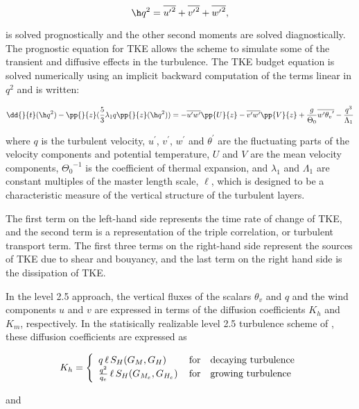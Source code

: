 \[ {\h}{q^2}={\overline{{u^{\prime}}^2}}+{\overline{{v^{\prime}}^2}}+{\overline{{w^{\prime}}^2}}, \]

is solved prognostically and the other second moments are solved diagnostically.
The prognostic equation for TKE allows the scheme to simulate 
some of the transient and diffusive effects in the turbulence. The TKE budget equation
is solved numerically using an implicit backward computation of the terms linear in $q^2$
and is written:

\[
{\dd{}{t} ({{\h} q^2})} - { \pp{}{z} ({ {5 \over 3} {{\lambda}_1} q { \pp {}{z} 
({\h}q^2)} })} =
{- \overline{{u^{\prime}}{w^{\prime}}} { \pp{U}{z} }} - {\overline{{v^{\prime}}{w^{\prime}}} 
{ \pp{V}{z} }} + {{g \over {\Theta_0}}{\overline{{w^{\prime}}{{{\theta}_v}^{\prime}}}} } 
- { q^3 \over {{\Lambda} _1} }
\]

where $q$ is the turbulent velocity, ${u^{\prime}}$, ${v^{\prime}}$, ${w^{\prime}}$ and 
${{\theta}^{\prime}}$ are the fluctuating parts of the velocity components and potential 
temperature, $U$ and $V$ are the mean velocity components, ${\Theta_0}^{-1}$ is the
coefficient of thermal expansion, and ${{\lambda}_1}$ and ${{\Lambda} _1}$ are constant
multiples of the master length scale, $\ell$, which is designed to be a characteristic measure
of the vertical structure of the turbulent layers.

The first term on the left-hand side represents the time rate of change of TKE, and
the second term is a representation of the triple correlation, or turbulent
transport term. The first three terms on the right-hand side represent the sources of
TKE due to shear and bouyancy, and the last term on the right hand side is the dissipation
of TKE.

In the level 2.5 approach, the vertical fluxes of the scalars $\theta_v$ and $q$ and the
wind components $u$ and $v$ are expressed in terms of the diffusion coefficients $K_h$ and
$K_m$, respectively.  In the statisically realizable level 2.5 turbulence scheme of 
\cite{helflab:88}, these diffusion coefficients are expressed as

\[
K_h 
 = \left\{ \begin{array}{l@{\quad\mbox{for}\quad}l} q \, \ell \, S_H(G_M,G_H) \, & \mbox{decaying turbulence}
\\ { q^2 \over {q_e} } \, \ell \, S_{H}(G_{M_e},G_{H_e}) \, & \mbox{growing turbulence} \end{array} \right.
\]

and

